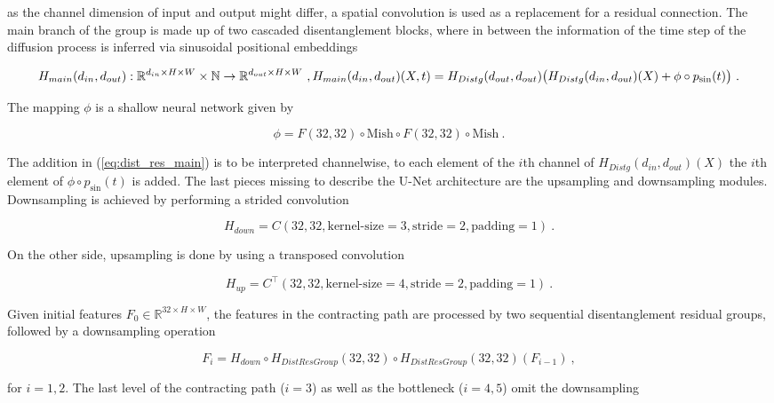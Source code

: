 as the channel dimension of input and output might differ, 
a spatial convolution is used as a replacement for a residual connection.
The main branch of the group is made up of two cascaded disentanglement blocks,
where in between the information of the time step of the diffusion process is inferred via sinusoidal positional embeddings 

    \begin{equation} \label{eq:distg_res_main}
        H_{main}(d_{in}, d_{out}): \mathbb R^{d_{in} \times H \times W} \times \mathbb N \to \mathbb R^{d_{out} \times H \times W} ~, \\
        H_{main}(d_{in}, d_{out})(X, t) = H_{Distg}(d_{out}, d_{out}) \big( H_{Distg}(d_{in}, d_{out})(X) + \phi \circ p_{\sin}(t) \big) ~.
    \end{equation}

The mapping $\phi$ is a shallow neural network given by

    $$ \phi = F(32, 32) \circ \text{Mish} \circ F(32, 32) \circ \text{Mish} ~.$$

The addition in (\ref{eq:dist_res_main}) is to be interpreted channelwise, 
to each element of the $i$th channel of $H_{Distg}(d_{in}, d_{out})(X)$ the $i$th element of $\phi \circ p_{\sin}(t)$ is added.
The last pieces missing to describe the U-Net architecture are the upsampling and downsampling modules.
Downsampling is achieved by performing a strided convolution

    \begin{equation*}
        H_{down} = C(32, 32, \text{kernel-size}=3, \text{stride}=2, \text{padding}=1) ~.
    \end{equation*}

On the other side, upsampling is done by using a transposed convolution

    \begin{equation*}
        H_{up} = C^\top(32, 32, \text{kernel-size}=4, \text{stride}=2, \text{padding}=1) ~.
    \end{equation*}

Given initial features $F_0 \in \mathbb R^{32 \times H \times W}$,
the features in the contracting path are processed by two sequential disentanglement residual groups, 
followed by a downsampling operation

    $$ F_{i} = H_{down} \circ H_{DistResGroup}(32, 32) \circ H_{DistResGroup}(32, 32)(F_{i-1}) ~,$$

for $i = 1, 2$. The last level of the contracting path ($i = 3$) as well as the bottleneck ($i = 4, 5$) omit the downsampling

